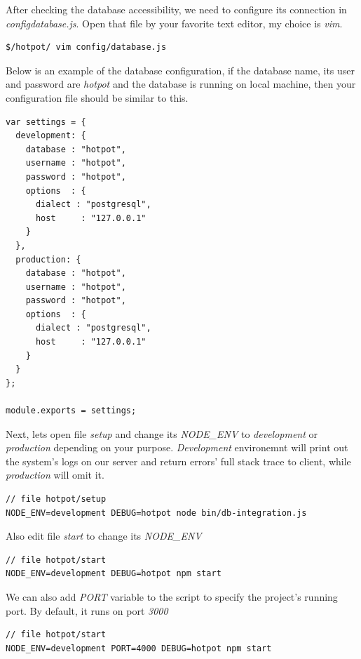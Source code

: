 After checking the database accessibility, we need to configure its connection in \emph{config\/database.js}. 
Open that file by your favorite text editor, my choice is \emph{vim}. 
\begin{lstlisting}[breaklines=false,frame=lt]
$/hotpot/ vim config/database.js
\end{lstlisting}

Below is an example of the database configuration, if the database name, its user and password are \emph{hotpot} and the database is running on local machine, then your configuration file should be similar to this.
\begin{lstlisting}[breaklines=false,frame=lt]
var settings = {                                                                                                                                                     
  development: { 
    database : "hotpot",
    username : "hotpot",
    password : "hotpot",
    options  : { 
      dialect : "postgresql",
      host     : "127.0.0.1"   
    }
  },
  production: { 
    database : "hotpot",
    username : "hotpot",
    password : "hotpot",
    options  : { 
      dialect : "postgresql",  
      host     : "127.0.0.1"   
    }
  }
};
  
module.exports = settings;
\end{lstlisting}

Next, lets open file \emph{setup} and change its \emph{NODE\_ENV} to \emph{development} or \emph{production} depending on your purpose.
\emph{Development} environemnt will print out the system's logs on our server and return errors' full stack trace to client, while  \emph{production} will omit it.
\begin{lstlisting}[breaklines=false,frame=lt]
// file hotpot/setup
NODE_ENV=development DEBUG=hotpot node bin/db-integration.js
\end{lstlisting}

Also edit file \emph{start} to change its \emph{NODE\_ENV}
\begin{lstlisting}[breaklines=false,frame=lt]
// file hotpot/start
NODE_ENV=development DEBUG=hotpot npm start
\end{lstlisting}
We can also add \emph{PORT} variable to the script to specify the project's running port. By default, it runs on port \emph{3000}
\begin{lstlisting}[breaklines=false,frame=lt]
// file hotpot/start
NODE_ENV=development PORT=4000 DEBUG=hotpot npm start
\end{lstlisting}

